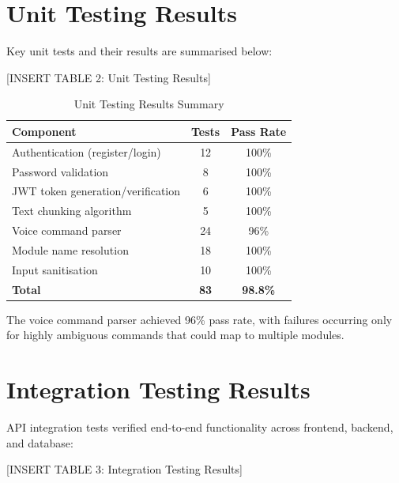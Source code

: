 \documentclass[12pt,a4paper]{report}
\begin{document}
\section{Unit Testing Results}

Key unit tests and their results are summarised below:

[INSERT TABLE 2: Unit Testing Results]

\begin{table}[h]
\centering
\caption{Unit Testing Results Summary}
\begin{tabular}{lcc}
\toprule
\textbf{Component} & \textbf{Tests} & \textbf{Pass Rate} \\
\midrule
Authentication (register/login) & 12 & 100\% \\
Password validation & 8 & 100\% \\
JWT token generation/verification & 6 & 100\% \\
Text chunking algorithm & 5 & 100\% \\
Voice command parser & 24 & 96\% \\
Module name resolution & 18 & 100\% \\
Input sanitisation & 10 & 100\% \\
\midrule
\textbf{Total} & \textbf{83} & \textbf{98.8\%} \\
\bottomrule
\end{tabular}
\label{tab:unit-tests}
\end{table}

The voice command parser achieved 96\% pass rate, with failures occurring only for highly ambiguous commands that could map to multiple modules.

\section{Integration Testing Results}

API integration tests verified end-to-end functionality across frontend, backend, and database:

[INSERT TABLE 3: Integration Testing Results]
\end{document}

